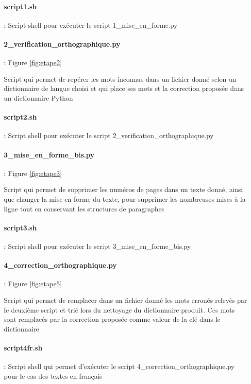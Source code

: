 \paragraph{script1.sh} : Script shell pour exécuter le script 1\_mise\_en\_forme.py

\pagebreak

\paragraph{2\_verification\_orthographique.py} : Figure \ref{fig:etape2}

Script qui permet de repérer les mots inconnus dans un fichier donné selon un dictionnaire de langue choisi et qui place ses mots et la correction proposée dans un dictionnaire Python

\paragraph{script2.sh} : Script shell pour exécuter le script 2\_verification\_orthographique.py

\paragraph{3\_mise\_en\_forme\_bis.py} : Figure \ref{fig:etape3}

Script qui permet de supprimer les numéros de pages dans un texte donné, ainsi que changer la mise en forme du texte, pour supprimer les nombreuses mises à la ligne tout en conservant les structures de paragraphes

\paragraph{script3.sh} : Script shell pour exécuter le script 3\_mise\_en\_forme\_bis.py

\paragraph{4\_correction\_orthographique.py} : Figure \ref{fig:etape5}

Script qui permet de remplacer dans un fichier donné les mots erronés relevés par le deuxième script et trié lors du nettoyage du dictionnaire produit. Ces mots sont remplacés par la correction proposée comme valeur de la clé dans le dictionnaire

\paragraph{script4fr.sh} : Script shell qui permet d'exécuter le script 4\_correction\_orthographique.py pour le cas des textes en français

